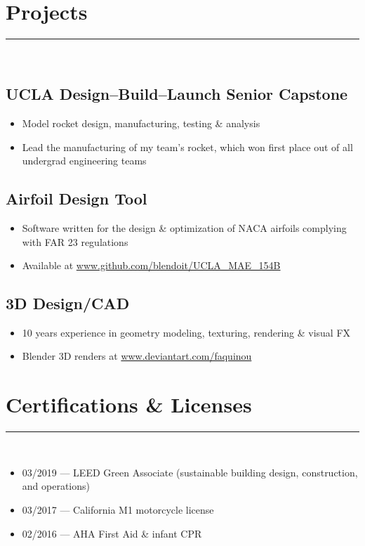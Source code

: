 \documentclass[10pt]{article}
\begin{document}
\section*{Projects}
\rule{\linewidth}{1pt}\\
\subsection*{UCLA Design--Build--Launch Senior Capstone}
\begin{itemize}
    \item Model rocket design, manufacturing, testing \& analysis
    \item Lead the manufacturing of my team's rocket, which won first place out of all undergrad engineering teams
\end{itemize}
\subsection*{Airfoil Design Tool}
\begin{itemize}
    \item Software written for the design \& optimization of NACA airfoils complying with FAR 23 regulations
    \item  Available at \url{www.github.com/blendoit/UCLA_MAE_154B}
\end{itemize}
\subsection*{3D Design/CAD}
\begin{itemize}
    \item 10 years experience in geometry modeling, texturing, rendering \& visual FX
    \item Blender 3D renders at \url{www.deviantart.com/faquinou}
\end{itemize}

\section*{Certifications \& Licenses}
\rule{\linewidth}{1pt}\\[0.2cm]
\begin{itemize}
    \item 03/2019 --- LEED Green Associate (sustainable building design, construction, and operations)
    \item 03/2017 --- California M1 motorcycle license
    \item 02/2016 --- AHA First Aid \& infant CPR
\end{itemize}
\end{document}
